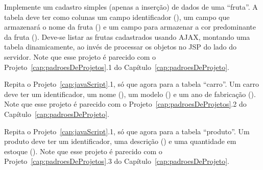 \begin{projetoSemArquivo}{}{}{}
    Implemente um cadastro simples (apenas a inserção) de dados de uma ``fruta''. A tabela deve ter como colunas um campo identificador (), um campo que armazenará o nome da fruta () e um campo para armazenar a cor predominante da fruta (). Deve-se listar as frutas cadastrados usando AJAX, montando uma tabela dinamicamente, ao invés de processar os objetos no JSP do lado do servidor. Note que esse projeto é parecido com o Projeto~\ref{cap:padroesDeProjetos}.1 do Capítulo~\ref{cap:padroesDeProjeto}.
\end{projetoSemArquivo}

\begin{projetoSemArquivo}{}{}{}
    Repita o Projeto~\ref{cap:javaScript}.1, só que agora para a tabela ``carro''. Um carro deve ter um identificador, um nome (), um modelo () e um ano de fabricação (). Note que esse projeto é parecido com o Projeto~\ref{cap:padroesDeProjetos}.2 do Capítulo~\ref{cap:padroesDeProjeto}.
\end{projetoSemArquivo}

\begin{projetoSemArquivo}{}{}{}
    Repita o Projeto~\ref{cap:javaScript}.1, só que agora para a tabela ``produto''. Um produto deve ter um identificador, uma descrição () e uma quantidade em estoque (). Note que esse projeto é parecido com o Projeto~\ref{cap:padroesDeProjetos}.3 do Capítulo~\ref{cap:padroesDeProjeto}.
\end{projetoSemArquivo}